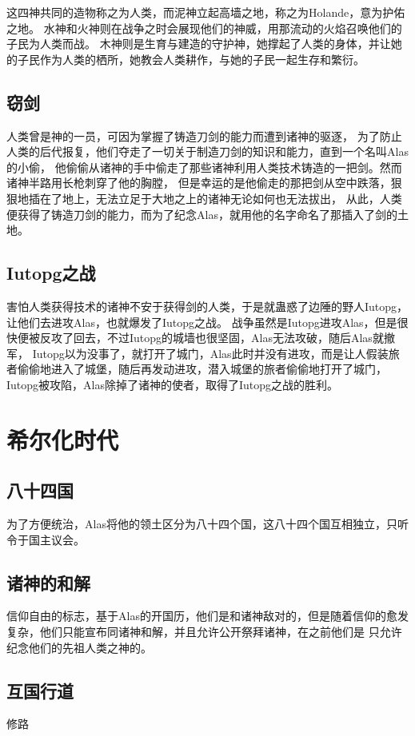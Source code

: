\documentclass[UTF8,12pt]{ctexbook}
\begin{document}
            这四神共同的造物称之为人类，而泥神立起高墙之地，称之为Holande，意为护佑之地。
            水神和火神则在战争之时会展现他们的神威，用那流动的火焰召唤他们的子民为人类而战。
            木神则是生育与建造的守护神，她撑起了人类的身体，并让她的子民作为人类的栖所，她教会人类耕作，与她的子民一起生存和繁衍。
        \section{窃剑}
            人类曾是神的一员，可因为掌握了铸造刀剑的能力而遭到诸神的驱逐，
            为了防止人类的后代报复，他们夺走了一切关于制造刀剑的知识和能力，直到一个名叫Alas的小偷，
            他偷偷从诸神的手中偷走了那些诸神利用人类技术铸造的一把剑。然而诸神半路用长枪刺穿了他的胸膛，
            但是幸运的是他偷走的那把剑从空中跌落，狠狠地插在了地上，无法立足于大地之上的诸神无论如何也无法拔出，
            从此，人类便获得了铸造刀剑的能力，而为了纪念Alas，就用他的名字命名了那插入了剑的土地。
        \section{Iutopg之战}
            害怕人类获得技术的诸神不安于获得剑的人类，于是就蛊惑了边陲的野人Iutopg，让他们去进攻Alas，也就爆发了Iutopg之战。
            战争虽然是Iutopg进攻Alas，但是很快便被反攻了回去，不过Iutopg的城墙也很坚固，Alas无法攻破，随后Alas就撤军，
            Iutopg以为没事了，就打开了城门，Alas此时并没有进攻，而是让人假装旅者偷偷地进入了城堡，随后再发动进攻，潜入城堡的旅者偷偷地打开了城门，
            Iutopg被攻陷，Alas除掉了诸神的使者，取得了Iutopg之战的胜利。
    \chapter{希尔化时代}
        \section{八十四国}
            为了方便统治，Alas将他的领土区分为八十四个国，这八十四个国互相独立，只听令于国主议会。
        \section{诸神的和解}
            信仰自由的标志，基于Alas的开国历，他们是和诸神敌对的，但是随着信仰的愈发复杂，他们只能宣布同诸神和解，并且允许公开祭拜诸神，在之前他们是
            只允许纪念他们的先祖人类之神的。
        \section{互国行道}
            修路
\end{document}
